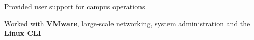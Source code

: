 \documentclass[]{resume}
\begin{document}
\begin{minipage}[t]{0.66\textwidth}


\begin{tightemize}
\item Provided user support for campus operations
\item Worked with \textbf{VMware}, large-scale networking, system administration and the \textbf{Linux CLI}
\end{tightemize}
\sectionsep



\end{minipage}
\end{document}
